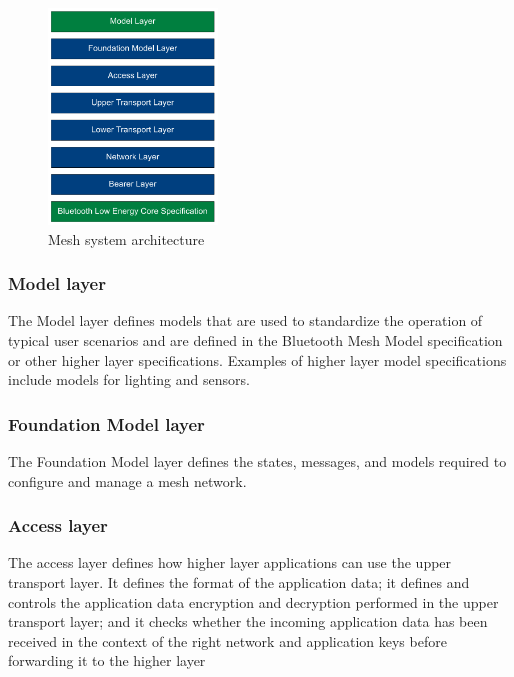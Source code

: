 \documentclass[\main/main.tex]{subfiles}
\begin{document}
\begin{figure}[H]
    \begin{center}
        \includegraphics[width=0.4\textwidth]{ble_mesh_layered_architecture.png}
    \end{center}
    \caption{Mesh system architecture}
    \label{fig:ble_mesh_layered_architecture}
\end{figure}

\subsubsection{Model layer}
The Model layer defines models that are used to standardize the operation of typical user scenarios and are defined in the Bluetooth Mesh Model specification or other higher layer specifications. Examples of higher layer model specifications include models for lighting and sensors.

\subsubsection{Foundation Model layer}
The Foundation Model layer defines the states, messages, and models required to configure and manage a mesh network.

\subsubsection{Access layer}
The access layer defines how higher layer applications can use the upper transport layer. It defines the format of the application data; it defines and controls the application data encryption and decryption performed in the upper transport layer; and it checks whether the incoming application data has been received in the context of the right network and application keys before forwarding it to the higher layer
\end{document}

